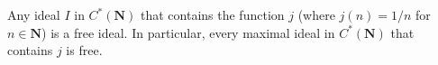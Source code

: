 Any ideal $I$ in $C^*(\mathbf{N})$ that contains the function $j$ (where $j(n) = 1/n$ for $n \in \mathbf{N}$) is a free ideal. In particular, every maximal ideal in $C^*(\mathbf{N})$ that contains $j$ is free.
